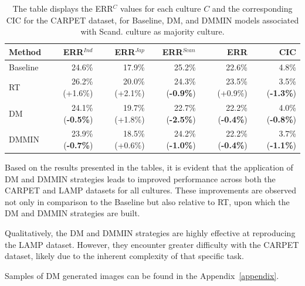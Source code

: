 %
%
\begin{table} [H]
\centering
\begin{tabular}{lrrrrr}
\toprule
\textbf{Method} & \textbf{ERR$^{Ind}$} & \textbf{ERR$^{Jap}$} & \textbf{ERR$^{Scan}$} & \textbf{ERR} & \textbf{CIC} \\
\midrule
Baseline     & 24.6\% & 17.9\% & 25.2\% & 22.6\% & 4.8\% \\
RT           & 26.2\% (+1.6\%) & 20.0\% (+2.1\%) & 24.3\% (\textbf{-0.9\%}) & 23.5\% (+0.9\%) & 3.5\% (\textbf{-1.3\%}) \\
DM           & 24.1\% (\textbf{-0.5\%}) & 19.7\% (+1.8\%) & 22.7\% (\textbf{-2.5\%}) & 22.2\% (\textbf{-0.4\%}) & 4.0\% (\textbf{-0.8\%}) \\
DMMIN        & 23.9\% (\textbf{-0.7\%}) & 18.5\% (+0.6\%) & 24.2\% (\textbf{-1.0\%}) & 22.2\% (\textbf{-0.4\%}) & 3.7\% (\textbf{-1.1\%}) \\
\bottomrule
\end{tabular}
\caption{The table displays the ERR$^C$ values for each culture $C$ and the corresponding CIC for the CARPET dataset, for Baseline, DM, and DMMIN models associated with Scand. culture as majority culture.}
\label{ch3:tab:diffCS}
\end{table}
%
Based on the results presented in the tables, it is evident that the application of DM and DMMIN strategies leads to improved performance across both the CARPET and LAMP datasets for all cultures. These improvements are observed not only in comparison to the Baseline but also relative to RT, upon which the DM and DMMIN strategies are built.

Qualitatively, the DM and DMMIN strategies are highly effective at reproducing the LAMP dataset. However, they encounter greater difficulty with the CARPET dataset, likely due to the inherent complexity of that specific task.

Samples of DM generated images can be found in the Appendix~\ref{appendix}.

